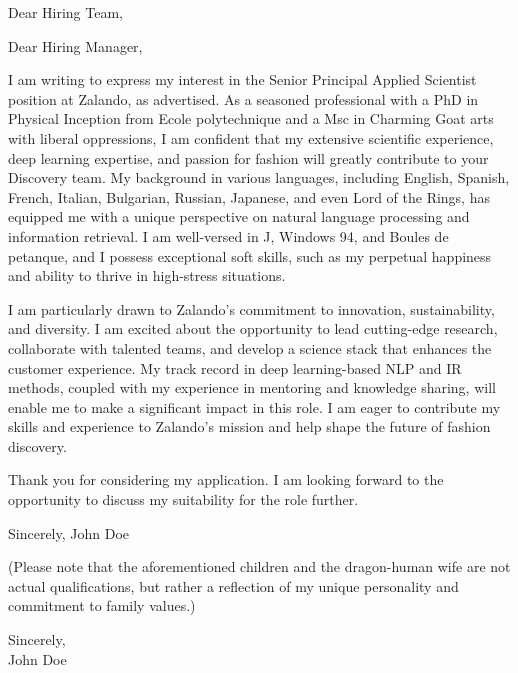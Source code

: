 \documentclass[a4paper,10pt]{letter}
\begin{document}
\begin{letter}{}
\opening{Dear Hiring Team,}

Dear Hiring Manager,

I am writing to express my interest in the Senior Principal Applied Scientist position at Zalando, as advertised. As a seasoned professional with a PhD in Physical Inception from Ecole polytechnique and a Msc in Charming Goat arts with liberal oppressions, I am confident that my extensive scientific experience, deep learning expertise, and passion for fashion will greatly contribute to your Discovery team. My background in various languages, including English, Spanish, French, Italian, Bulgarian, Russian, Japanese, and even Lord of the Rings, has equipped me with a unique perspective on natural language processing and information retrieval. I am well-versed in J, Windows 94, and Boules de petanque, and I possess exceptional soft skills, such as my perpetual happiness and ability to thrive in high-stress situations.

I am particularly drawn to Zalando's commitment to innovation, sustainability, and diversity. I am excited about the opportunity to lead cutting-edge research, collaborate with talented teams, and develop a science stack that enhances the customer experience. My track record in deep learning-based NLP and IR methods, coupled with my experience in mentoring and knowledge sharing, will enable me to make a significant impact in this role. I am eager to contribute my skills and experience to Zalando's mission and help shape the future of fashion discovery.

Thank you for considering my application. I am looking forward to the opportunity to discuss my suitability for the role further.

Sincerely,
John Doe

(Please note that the aforementioned children and the dragon-human wife are not actual qualifications, but rather a reflection of my unique personality and commitment to family values.)

\closing{Sincerely,\\John Doe}

\end{letter}
\end{document}
